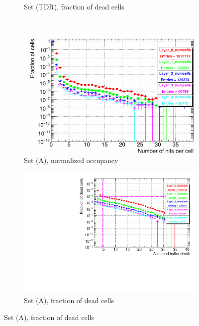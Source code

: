 \begin{figure}[htbp]
\begin{subfigure}[b]{0.49\textwidth}
   \caption{Set (TDR), fraction of dead cells}
   \end{subfigure}\\
  \begin{subfigure}[b]{0.49\textwidth}
   \centering
    \includegraphics[width=\textwidth]{Figures/Pairs/Appendix/occupancy_numcells_SiVertexBarrel_ILC250_SetA_corrected_Barrel_size.pdf}
   \caption{Set (A), normalized occupancy}
   \end{subfigure}
   \hfill
    \begin{subfigure}[b]{0.49\textwidth}
   \centering
    \includegraphics[width=\textwidth]{Figures/Pairs/Appendix/occupancy_deadcells_SiVertexBarrel_ILC250_SetA_corrected_Barrel_size.pdf}
   \caption{Set (A), fraction of dead cells}
   \end{subfigure}
     \end{figure}
